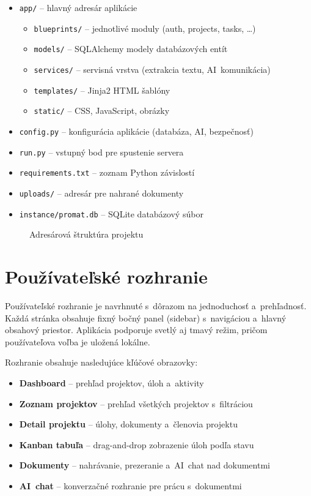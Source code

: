 \begin{itemize}
  \item \texttt{app/} -- hlavný adresár aplikácie
  \begin{itemize}
    \item \texttt{blueprints/} -- jednotlivé moduly (auth, projects, tasks, \ldots)
    \item \texttt{models/} -- SQLAlchemy modely databázových entít
    \item \texttt{services/} -- servisná vrstva (extrakcia textu, AI~komunikácia)
    \item \texttt{templates/} -- Jinja2 HTML šablóny
    \item \texttt{static/} -- CSS, JavaScript, obrázky
  \end{itemize}
  \item \texttt{config.py} -- konfigurácia aplikácie (databáza, AI, bezpečnosť)
  \item \texttt{run.py} -- vstupný bod pre spustenie servera
  \item \texttt{requirements.txt} -- zoznam Python závislostí
  \item \texttt{uploads/} -- adresár pre nahrané dokumenty
  \item \texttt{instance/promat.db} -- SQLite databázový súbor
\end{itemize}

\begin{figure}[H]
  \centering
  \caption{Adresárová štruktúra projektu}
  \label{fig:struktura}
\end{figure}

\section{Používateľské rozhranie}

        Používateľské rozhranie je navrhnuté s~dôrazom na jednoduchosť a~prehľadnosť.
Každá stránka obsahuje fixný bočný panel (sidebar) s~navigáciou a~hlavný obsahový
priestor. Aplikácia podporuje svetlý aj tmavý režim, pričom používateľova voľba je
uložená lokálne.

        Rozhranie obsahuje nasledujúce kľúčové obrazovky:

\begin{itemize}
  \item \textbf{Dashboard} -- prehľad projektov, úloh a~aktivity
  \item \textbf{Zoznam projektov} -- prehľad všetkých projektov s~filtráciou
  \item \textbf{Detail projektu} -- úlohy, dokumenty a~členovia projektu
  \item \textbf{Kanban tabuľa} -- drag-and-drop zobrazenie úloh podľa stavu
  \item \textbf{Dokumenty} -- nahrávanie, prezeranie a~AI~chat nad dokumentmi
  \item \textbf{AI~chat} -- konverzačné rozhranie pre prácu s~dokumentmi
\end{itemize}

